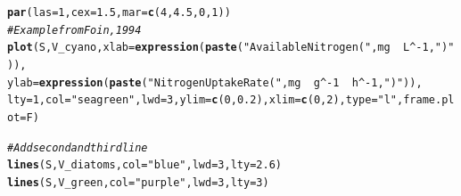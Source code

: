 \documentclass{tufte-handout}\usepackage[]{graphicx}\usepackage[]{color}
\makeatletter
\newcommand{\hlnum}[1]{\textcolor[rgb]{0.686,0.059,0.569}{#1}}%
\newcommand{\hlstr}[1]{\textcolor[rgb]{0.192,0.494,0.8}{#1}}%
\newcommand{\hlcom}[1]{\textcolor[rgb]{0.678,0.584,0.686}{\textit{#1}}}%
\newcommand{\hlopt}[1]{\textcolor[rgb]{0,0,0}{#1}}%
\newcommand{\hlstd}[1]{\textcolor[rgb]{0.345,0.345,0.345}{#1}}%
\newcommand{\hlkwc}[1]{\textcolor[rgb]{0.333,0.667,0.333}{#1}}%
\newcommand{\hlkwd}[1]{\textcolor[rgb]{0.737,0.353,0.396}{\textbf{#1}}}%
\newenvironment{kframe}{%
 \def\at@end@of@kframe{}%
 \ifinner\ifhmode%
  \def\at@end@of@kframe{\end{minipage}}%
  \begin{minipage}{\columnwidth}%
 \fi\fi%
 \def\FrameCommand##1{\hskip\@totalleftmargin \hskip-\fboxsep
 \colorbox{shadecolor}{##1}\hskip-\fboxsep
     \hskip-\linewidth \hskip-\@totalleftmargin \hskip\columnwidth}%
 \MakeFramed {\advance\hsize-\width
   \@totalleftmargin\z@ \linewidth\hsize
   \@setminipage}}%
 {\par\unskip\endMakeFramed%
 \at@end@of@kframe}
\newenvironment{knitrout}{}{} %
\makeatother
\begin{document}
\begin{knitrout}
\color{fgcolor}\begin{kframe}
\begin{alltt}
\hlkwd{par}\hlstd{(}\hlkwc{las}\hlstd{=}\hlnum{1}\hlstd{,} \hlkwc{cex}\hlstd{=}\hlnum{1.5}\hlstd{,} \hlkwc{mar}\hlstd{=}\hlkwd{c}\hlstd{(}\hlnum{4}\hlstd{,}\hlnum{4.5}\hlstd{,}\hlnum{0}\hlstd{,}\hlnum{1}\hlstd{))}
\hlcom{# Example from Foin, 1994}
\hlkwd{plot}\hlstd{(S,V_cyano,} \hlkwc{xlab}\hlstd{=}\hlkwd{expression}\hlstd{(}\hlkwd{paste}\hlstd{(}\hlstr{"Available Nitrogen ("}\hlstd{, mg} \hlopt{~~} \hlstd{L}\hlopt{^-}\hlnum{1}\hlstd{,} \hlstr{")"}\hlstd{)),}
  \hlkwc{ylab}\hlstd{=}\hlkwd{expression}\hlstd{(}\hlkwd{paste}\hlstd{(}\hlstr{"Nitrogen Uptake Rate ( "}\hlstd{, mg} \hlopt{~~} \hlstd{g}\hlopt{^-}\hlnum{1} \hlopt{~~} \hlstd{h}\hlopt{^-}\hlnum{1}\hlstd{,} \hlstr{")"}\hlstd{)),}
        \hlkwc{lty}\hlstd{=}\hlnum{1}\hlstd{,} \hlkwc{col}\hlstd{=}\hlstr{"seagreen"}\hlstd{,} \hlkwc{lwd}\hlstd{=}\hlnum{3}\hlstd{,} \hlkwc{ylim}\hlstd{=}\hlkwd{c}\hlstd{(}\hlnum{0}\hlstd{,}\hlnum{0.2}\hlstd{),} \hlkwc{xlim}\hlstd{=}\hlkwd{c}\hlstd{(}\hlnum{0}\hlstd{,}\hlnum{2}\hlstd{),} \hlkwc{type}\hlstd{=}\hlstr{"l"}\hlstd{,} \hlkwc{frame.plot}\hlstd{=F)}

\hlcom{# Add second and third line}
\hlkwd{lines}\hlstd{(S,V_diatoms,} \hlkwc{col}\hlstd{=}\hlstr{"blue"}\hlstd{,} \hlkwc{lwd}\hlstd{=}\hlnum{3}\hlstd{,} \hlkwc{lty}\hlstd{=}\hlnum{2.6}\hlstd{)}
\hlkwd{lines}\hlstd{(S,V_green,} \hlkwc{col}\hlstd{=}\hlstr{"purple"}\hlstd{,} \hlkwc{lwd}\hlstd{=}\hlnum{3}\hlstd{,} \hlkwc{lty}\hlstd{=}\hlnum{3}\hlstd{)}


\end{alltt}
\end{kframe}
\end{knitrout}
\end{document}
